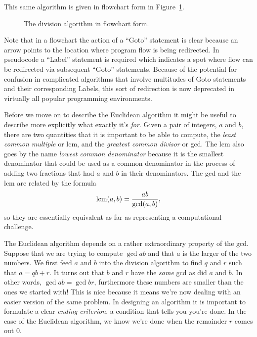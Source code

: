 This same algorithm is given in flowchart form in
Figure~\ref{fig:div_alg}.

\begin{figure}[!hbt]
\begin{center}

\end{center}
\caption{The division algorithm in flowchart form.}
\label{fig:div_alg}
\end{figure}

Note that in a flowchart the action of a ``Goto'' statement is clear
because an arrow points to the location where program flow is being
redirected.  In pseudocode a ``Label'' statement is required which
indicates a spot where flow can be redirected via subsequent ``Goto''
statements.  Because of the potential for confusion in complicated
algorithms that involve multitudes of Goto statements and their
corresponding Labels, this sort of redirection is now deprecated in
virtually all popular programming environments.

Before we move on to describe the Euclidean algorithm it might be
useful to describe more explicitly what exactly it's {\em for}.  
Given a pair of integers, $a$ and $b$, there are two quantities that 
it is important to be able to compute, the 
\emph{least common multiple}
or lcm, and the  
\emph{greatest common divisor} or gcd.  The lcm also
goes by the name {\em lowest common denominator} because it is the
smallest denominator that could be used as a common denominator in the
process of adding two fractions that had $a$ and $b$ in their
denominators.  The gcd and the lcm are related by the formula 
\[ \mbox{lcm} (a, b) = \frac{ab}{\mbox{gcd} (a, b)}, \]
so they are essentially equivalent as far as representing a
computational challenge.

The  Euclidean algorithm depends 
on a rather extraordinary property of
the gcd.  Suppose that we are trying to compute $\gcd{a}{b}$ and that
$a$ is the larger of the two numbers.  We first feed $a$ and $b$ into
the division algorithm to find $q$ and $r$ such that $a = qb +r $.  It
turns out that $b$ and $r$ have the {\em same} gcd as did $a$ and
$b$.  In other words, $\gcd{a}{b} = \gcd{b}{r}$, furthermore these
numbers are smaller than the ones we started with!  This is nice
because it means we're now dealing with an easier version of the same
problem.  In designing an algorithm it is important to formulate a
clear {\em ending criterion}, a condition that tells you you're done.
In the case of the Euclidean algorithm, we know we're done when the
remainder $r$ comes out $0$.  

